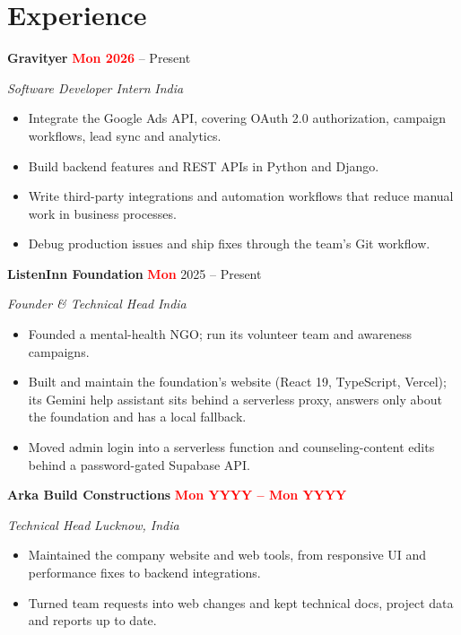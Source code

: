 \documentclass[10pt,a4paper]{article}
\newcommand{\role}[4]{%
  \textbf{#1} \hfill #2\par
  \textit{#3} \hfill \textit{#4}\par}
\newcommand{\fillin}[1]{\textcolor{red}{\textbf{#1}}}
\begin{document}
\section{Experience}
\role{Gravityer}{\fillin{Mon 2026} -- Present}{Software Developer Intern}{India}
\begin{itemize}
  \item Integrate the Google Ads API, covering OAuth 2.0 authorization, campaign workflows, lead sync and analytics.
  \item Build backend features and REST APIs in Python and Django.
  \item Write third-party integrations and automation workflows that reduce manual work in business processes.
  \item Debug production issues and ship fixes through the team's Git workflow.
\end{itemize}
\vspace{2pt}

\role{ListenInn Foundation}{\fillin{Mon} 2025 -- Present}{Founder \& Technical Head}{India}
\begin{itemize}
  \item Founded a mental-health NGO; run its volunteer team and awareness campaigns.
  \item Built and maintain the foundation's website (React 19, TypeScript, Vercel); its Gemini help assistant sits behind a serverless proxy, answers only about the foundation and has a local fallback.
  \item Moved admin login into a serverless function and counseling-content edits behind a password-gated Supabase API.
\end{itemize}
\vspace{2pt}

\role{Arka Build Constructions}{\fillin{Mon YYYY -- Mon YYYY}}{Technical Head}{Lucknow, India}
\begin{itemize}
  \item Maintained the company website and web tools, from responsive UI and performance fixes to backend integrations.
  \item Turned team requests into web changes and kept technical docs, project data and reports up to date.
\end{itemize}

\end{document}
